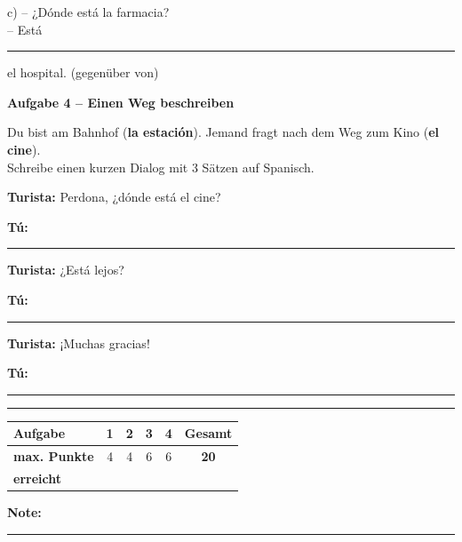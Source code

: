 \documentclass[11pt, a4paper]{article}
\newcommand{\fachfarbe}{spanisch}
\newcommand{\punktebox}[1]{\hfill\fbox{\small \_/#1}}
\newcommand{\luecke}[1]{\rule{#1}{0.4pt}}
\newenvironment{aufgabe}[1]{%
    \needspace{5\baselineskip}%
    \nopagebreak[4]%
    \vspace{10pt}
    \noindent\textbf{\textcolor{\fachfarbe}{Aufgabe #1}}
    \nopagebreak[4]%
    \vspace{5pt}
    \nopagebreak[4]%
    \begin{list}{}{\leftmargin=0pt}
    \item[]
}{%
    \end{list}
}
\newcommand{\es}[1]{\textcolor{\fachfarbe}{\textbf{#1}}}
\begin{document}
\noindent
c) -- ¿Dónde está la farmacia?\\
\hspace*{0.5cm} -- Está \luecke{4cm} el hospital. (gegenüber von)

\vspace{15pt}


\begin{aufgabe}{4 -- Einen Weg beschreiben}
Du bist am Bahnhof (\es{la estación}). Jemand fragt nach dem Weg zum Kino (\es{el cine}).\\
Schreibe einen kurzen Dialog mit 3 Sätzen auf Spanisch. \punktebox{6}
\end{aufgabe}

\noindent
\textbf{Turista:} Perdona, ¿dónde está el cine?

\vspace{0.8em}

\noindent
\textbf{Tú:} \luecke{10cm}

\vspace{1.2em}

\noindent
\textbf{Turista:} ¿Está lejos?

\vspace{0.8em}

\noindent
\textbf{Tú:} \luecke{10cm}

\vspace{1.2em}

\noindent
\textbf{Turista:} ¡Muchas gracias!

\vspace{0.8em}

\noindent
\textbf{Tú:} \luecke{6cm}


\vspace{25pt}
\hrule
\vspace{10pt}

\noindent
\begin{tabularx}{\textwidth}{|X|c|c|c|c||c|}
\hline
\textbf{Aufgabe} & 1 & 2 & 3 & 4 & \textbf{Gesamt} \\
\hline
\textbf{max. Punkte} & 4 & 4 & 6 & 6 & \textbf{20} \\
\hline
\textbf{erreicht} & & & & & \\[0.8em]
\hline
\end{tabularx}

\vspace{10pt}

\begin{flushright}
\textbf{Note:} \luecke{2cm}
\end{flushright}
\end{document}
